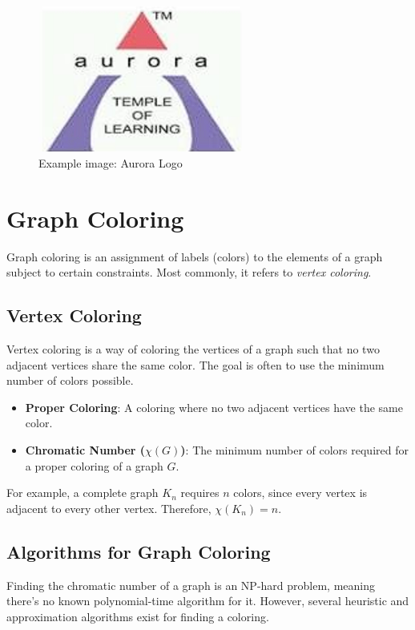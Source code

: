 \documentclass[11pt, a4paper]{article}
\begin{document}
\begin{figure}[h!]
    \centering
    \includegraphics[width=0.6\textwidth]{aurora_logo.png}
    \caption{Example image: Aurora Logo}
    \label{fig:aurora_logo}
\end{figure}

\section{Graph Coloring}
Graph coloring is an assignment of labels (colors) to the elements of a graph subject to certain constraints. Most commonly, it refers to \textit{vertex coloring}.

\subsection{Vertex Coloring}
Vertex coloring is a way of coloring the vertices of a graph such that no two adjacent vertices share the same color. The goal is often to use the minimum number of colors possible.

\begin{itemize}[noitemsep,topsep=3pt,parsep=3pt,partopsep=0pt]
    \item \textbf{Proper Coloring}: A coloring where no two adjacent vertices have the same color.
    \item \textbf{Chromatic Number ($\chi(G)$)}: The minimum number of colors required for a proper coloring of a graph $G$.
\end{itemize}

For example, a complete graph $K_n$ requires $n$ colors, since every vertex is adjacent to every other vertex. Therefore, $\chi(K_n) = n$.

\subsection{Algorithms for Graph Coloring}
Finding the chromatic number of a graph is an NP-hard problem, meaning there's no known polynomial-time algorithm for it. However, several heuristic and approximation algorithms exist for finding a coloring.
\end{document}
